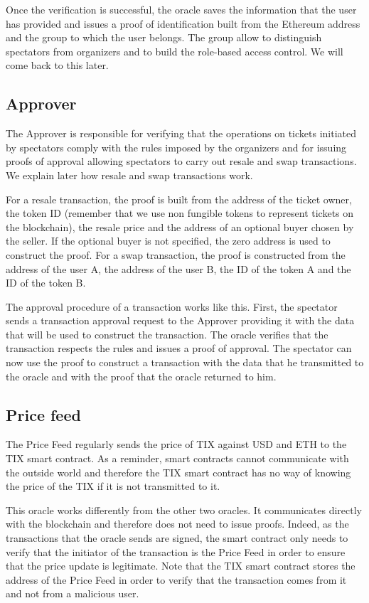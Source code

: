 \documentclass[a4paper,11pt,oneside]{report}
\begin{document}
Once the verification is successful, the oracle saves the information that the user has provided and issues a proof of identification built from the Ethereum address and the group to which the user belongs. The group allow to distinguish spectators from organizers and to build the role-based access control. We will come back to this later.

\subsection{Approver}
The Approver is responsible for verifying that the operations on tickets initiated by spectators comply with the rules imposed by the organizers and for issuing proofs of approval allowing spectators to carry out resale and swap transactions. We explain later how resale and swap transactions work.

For a resale transaction, the proof is built from the address of the ticket owner, the token ID (remember that we use non fungible tokens to represent tickets on the blockchain), the resale price and the address of an optional buyer chosen by the seller. If the optional buyer is not specified, the zero address is used to construct the proof. For a swap transaction, the proof is constructed from the address of the user A, the address of the user B, the ID of the token A and the ID of the token B.

The approval procedure of a transaction works like this. First, the spectator sends a transaction approval request to the Approver providing it with the data that will be used to construct the transaction. The oracle verifies that the transaction respects the rules and issues a proof of approval. The spectator can now use the proof to construct a transaction with the data that he transmitted to the oracle and with the proof that the oracle returned to him.

\subsection{Price feed}
The Price Feed regularly sends the price of TIX against USD and ETH to the TIX smart contract. As a reminder, smart contracts cannot communicate with the outside world and therefore the TIX smart contract has no way of knowing the price of the TIX if it is not transmitted to it.

This oracle works differently from the other two oracles. It communicates directly with the blockchain and therefore does not need to issue proofs. Indeed, as the transactions that the oracle sends are signed, the smart contract only needs to verify that the initiator of the transaction is the Price Feed in order to ensure that the price update is legitimate. Note that the TIX smart contract stores the address of the Price Feed in order to verify that the transaction comes from it and not from a malicious user.
\end{document}
